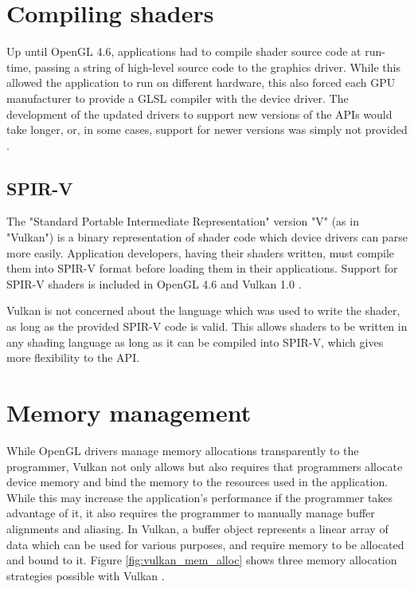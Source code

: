 \section{Compiling shaders}
Up until OpenGL 4.6, applications had to compile shader source code at run-time, passing a string of high-level source code to the graphics driver. While this allowed the application to run on different hardware, this also forced each GPU manufacturer to provide a GLSL compiler with the device driver. The development of the updated drivers to support new versions of the APIs would take longer, or, in some cases, support for newer versions was simply not provided \cite{apple_nopengl}.

\subsection{SPIR-V}
The "Standard Portable Intermediate Representation" version "V" (as in "Vulkan") is a binary representation of shader code which device drivers can parse more easily. Application developers, having their shaders written, must compile them into SPIR-V format before loading them in their applications. Support for SPIR-V shaders is included in OpenGL 4.6 and Vulkan 1.0 \cite{spirv_spec}.

Vulkan is not concerned about the language which was used to write the shader, as long as the provided SPIR-V code is valid. This allows shaders to be written in any shading language as long as it can be compiled into SPIR-V, which gives more flexibility to the API.

\section{Memory management}
While OpenGL drivers manage memory allocations transparently to the programmer, Vulkan not only allows but also requires that programmers allocate device memory and bind the memory to the resources used in the application. While this may increase the application's performance if the programmer takes advantage of it, it also requires the programmer to manually manage buffer alignments and aliasing. In Vulkan, a buffer object represents a linear array of data which can be used for various purposes, and require memory to be allocated and bound to it. Figure \ref{fig:vulkan_mem_alloc} shows three memory allocation strategies possible with Vulkan \cite{vulkan_mem_mgmt}.

